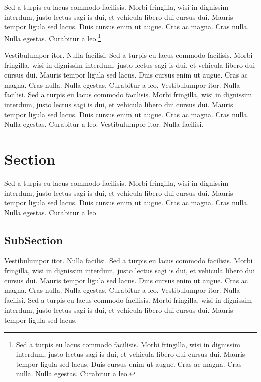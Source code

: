 \documentclass[letterpaper,12pt,oneside]{utexas-dissertation}
\begin{document}
Sed a turpis eu lacus commodo facilisis. Morbi fringilla, wisi in dignissim interdum, justo lectus sagi is dui, et vehicula libero dui cursus dui. Mauris tempor ligula sed lacus. Duis cursus enim ut augue. Cras ac magna. Cras nulla. Nulla egestas. Curabitur a leo.\footnote{Sed a turpis eu lacus commodo facilisis. Morbi fringilla, wisi in dignissim interdum, justo lectus sagi is dui, et vehicula libero dui cursus dui. Mauris tempor ligula sed lacus. Duis cursus enim ut augue. Cras ac magna. Cras nulla. Nulla egestas. Curabitur a leo.}

Vestibulumpor itor. Nulla facilisi. Sed a turpis eu lacus commodo facilisis. Morbi fringilla, wisi in dignissim interdum, justo lectus sagi is dui, et vehicula libero dui cursus dui. Mauris tempor ligula sed lacus. Duis cursus enim ut augue. Cras ac magna. Cras nulla. Nulla egestas. Curabitur a leo.  
Vestibulumpor itor. Nulla facilisi. Sed a turpis eu lacus commodo facilisis. Morbi fringilla, wisi in dignissim interdum, justo lectus sagi is dui, et vehicula libero dui cursus dui. Mauris tempor ligula sed lacus. Duis cursus enim ut augue. Cras ac magna. Cras nulla. Nulla egestas. Curabitur a leo.  
Vestibulumpor itor. Nulla facilisi. 

\section{Section}
Sed a turpis eu lacus commodo facilisis. Morbi fringilla, wisi in dignissim interdum, justo lectus sagi is dui, et vehicula libero dui cursus dui. Mauris tempor ligula sed lacus. Duis cursus enim ut augue. Cras ac magna. Cras nulla. Nulla egestas. Curabitur a leo.  

\subsection{SubSection}
Vestibulumpor itor. Nulla facilisi. Sed a turpis eu lacus commodo facilisis. Morbi fringilla, wisi in dignissim interdum, justo lectus sagi is dui, et vehicula libero dui cursus dui. Mauris tempor ligula sed lacus. Duis cursus enim ut augue. Cras ac magna. Cras nulla. Nulla egestas. Curabitur a leo.  
Vestibulumpor itor. Nulla facilisi. Sed a turpis eu lacus commodo facilisis. Morbi fringilla, wisi in dignissim interdum, justo lectus sagi is dui, et vehicula libero dui cursus dui. Mauris tempor ligula sed lacus. 
\end{document}
